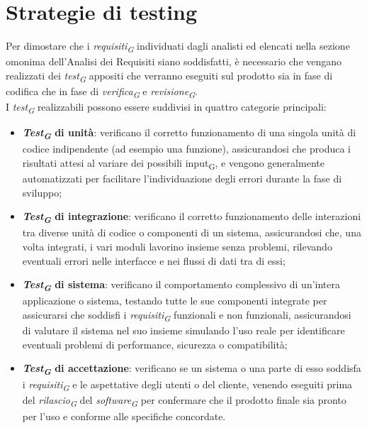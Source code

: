 \section{Strategie di testing}
Per dimostare che i \textit{requisiti\textsubscript{G}} individuati dagli analisti ed elencati nella sezione omonima dell'Analisi dei Requisiti siano soddisfatti, è necessario che vengano realizzati dei \textit{test\textsubscript{G}} appositi che verranno eseguiti sul prodotto sia in fase di codifica che in fase di \textit{verifica\textsubscript{G}} e \textit{revisione\textsubscript{G}}.\\
I \textit{test\textsubscript{G}} realizzabili possono essere suddivisi in quattro categorie principali:
\begin{itemize}
    \item \textbf{\textit{Test\textsubscript{G}} di unità}: verificano il corretto funzionamento di una singola unità di codice indipendente (ad esempio una funzione), assicurandosi che produca i risultati attesi al variare dei possibili input\textsubscript{G}, e vengono generalmente automatizzati per facilitare l'individuazione degli errori durante la fase di sviluppo;
    \item \textbf{\textit{Test\textsubscript{G}} di integrazione}: verificano il corretto funzionamento delle interazioni tra diverse unità di codice o componenti di un sistema, assicurandosi che, una volta integrati, i vari moduli lavorino insieme senza problemi, rilevando eventuali errori nelle interfacce e nei flussi di dati tra di essi;
    \item \textbf{\textit{Test\textsubscript{G}} di sistema}: verificano il comportamento complessivo di un'intera applicazione o sistema, testando tutte le sue componenti integrate per assicurarsi che soddisfi i \textit{requisiti\textsubscript{G}} funzionali e non funzionali, assicurandosi di valutare il sistema nel suo insieme simulando l'uso reale per identificare eventuali problemi di performance, sicurezza o compatibilità;
    \item \textbf{\textit{Test\textsubscript{G}} di accettazione}: verificano se un sistema o una parte di esso soddisfa i \textit{requisiti\textsubscript{G}} e le aspettative degli utenti o del cliente, venendo eseguiti prima del \textit{rilascio\textsubscript{G}} del \textit{software\textsubscript{G}} per confermare che il prodotto finale sia pronto per l'uso e conforme alle specifiche concordate.
\end{itemize}

